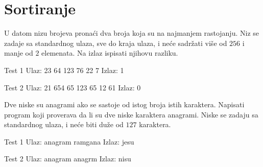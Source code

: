 \section{Sortiranje}


\begin{Exercise}[label=501]
  U datom nizu brojeva pronaći dva broja koja su na najmanjem
  rastojanju. Niz se zadaje sa standardnog ulaza, sve do kraja ulaza,
  i neće sadržati više od $256$ i manje od $2$ elemenata. Na izlaz
  ispisati njihovu razliku.  
  
\begin{miditest}
\begin{test}{Test 1}
Ulaz:   23 64 123 76 22 7
Izlaz:  1
\end{test}
\end{miditest}

\begin{miditest}
\begin{test}{Test 2}
Ulaz:   21 654 65 123 65 12 61
Izlaz:  0
\end{test}
\end{miditest}
  
\end{Exercise}

\begin{Answer}[ref=501]
\end{Answer}
\begin{Exercise}[label=502]
  Dve niske su anagrami ako se sastoje od istog broja istih
  karaktera. Napisati program koji proverava da li su dve niske
  karaktera anagrami.  Niske se zadaju sa standardnog ulaza, i neće
  biti duže od $127$ karaktera.  
  
\begin{miditest}
\begin{test}{Test 1}
Ulaz:   anagram ramgana
Izlaz:  jesu
\end{test}
\end{miditest}
\begin{miditest}
\begin{test}{Test 2}
Ulaz:   anagram anagrm
Izlaz:  nisu
\end{test}
\end{miditest}
  
\end{Exercise}

